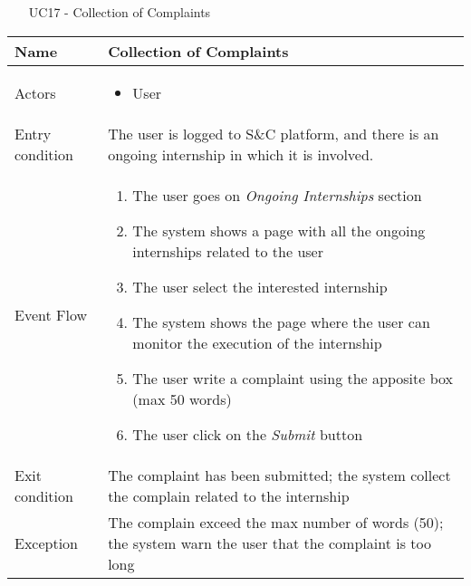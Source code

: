 				
				\begin{table} [H]
					\centering
					\begin{itemize}
						\item [UC17] - Collection of Complaints
					\end{itemize}
					
					\begin{tabular}{|| P{7.5cm} | P{7.5cm} ||}
						\hline
						Name & Collection of Complaints \\
						\hline
						Actors & \parbox{5cm}{\begin{itemize}
								\item User
							\end{itemize}
						} \\
						\hline
						Entry condition & The user is logged to S\&C platform, 
						and there is an ongoing internship in 
						which it is involved.  \\
						\hline
						Event Flow & \parbox{5cm}{\begin{enumerate}
								\item The user goes on \textit{Ongoing 
								Internships} section 
								\item The system shows a page with 
								all the ongoing internships 
								related to the user  
								\item The user select the interested 
								internship  
								\item The system shows the page 
								where the user can monitor the 
								execution of the internship
								\item The user write a complaint 
								using the apposite box (max 50 
								words) 
								\item The user click on the \textit{Submit}
								button
						\end{enumerate}} \\
						\hline 
						Exit condition & The complaint has been submitted; 
						the system collect the complain 
						related to the internship \\
						\hline
						Exception & The complain exceed the max number 
						of words (50); the system warn the 
						user that the complaint is too long \\
						\hline
					\end{tabular}
				\end{table}
				
